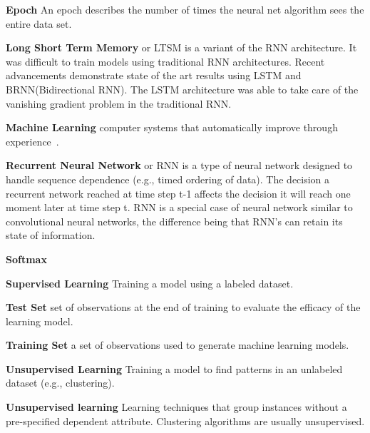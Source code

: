 \begin{description}
\item{\textbf{Epoch}}  An epoch describes the number of times the neural net algorithm sees the entire data set.
\item{\textbf{Long Short Term Memory}} or LTSM is a variant of the RNN architecture. It was difficult to train models using traditional RNN architectures. Recent advancements demonstrate state of the art results using LSTM and BRNN(Bidirectional RNN). The LSTM architecture was able to take care of the vanishing gradient problem in the traditional RNN.

\item{\textbf{Machine Learning}} computer systems that automatically improve through experience~\cite{Jordan255}.

\item{\textbf{Recurrent Neural Network}} or RNN is a type of neural network designed to handle sequence dependence (e.g., timed ordering of data). The decision a recurrent network reached at time step t-1 affects the decision it will reach one moment later at time step t.  RNN is a special case of neural network similar to convolutional neural networks, the difference being that RNN’s can retain its state of information.
\item{\textbf{Softmax}}

\item{\textbf{Supervised Learning}} Training a model using a labeled dataset.
\item{\textbf{Test Set}} set of observations at the end of training to evaluate the efficacy of the learning model.

\item{\textbf{Training Set}} a set of observations used to generate machine learning models.
\item{\textbf{Unsupervised Learning}} Training a model to find patterns in an unlabeled dataset (e.g., clustering).



\item{\textbf{Unsupervised learning}} 
Learning techniques that group instances without a pre-specified dependent attribute. Clustering algorithms are usually unsupervised.



\end{description}